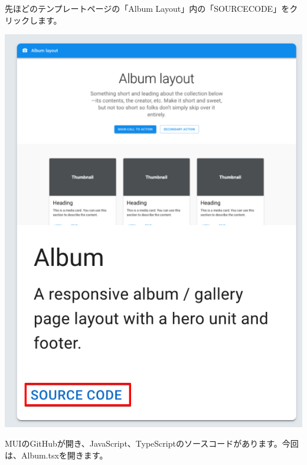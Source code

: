 \clearpage


先ほどのテンプレートページの「Album Layout」内の「SOURCECODE」をクリックします。

\begin{reviewimage}[H]%
\includegraphics[width=0.4\maxwidth]{./images/03-todo-with-react/mui006-albumLayoutSource.png}%
\label{image:03-todo-with-react:mui006-albumLayoutSource}
\end{reviewimage}

MUIのGitHubが開き、JavaScript、TypeScriptのソースコードがあります。今回は、Album.tsxを開きます。

